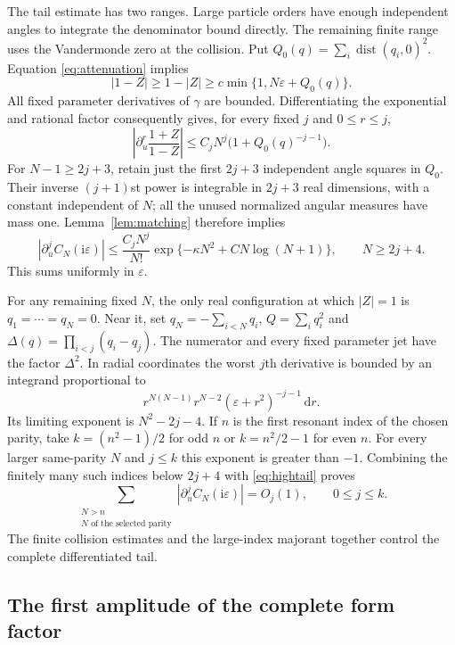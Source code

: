 \documentclass[11pt]{article}
\numberwithin{equation}{section}
\theoremstyle{definition}
\newcommand{\dd}{\,\mathrm d}
\newcommand{\ii}{\mathrm i}
\newcommand{\eps}{\varepsilon}
\newcommand{\dist}{\operatorname{dist}}
\begin{document}
The tail estimate has two ranges. Large particle orders have enough
independent angles to integrate the denominator bound directly. The
remaining finite range uses the Vandermonde zero at the collision.
Put $Q_0(q)=\sum_i\dist(q_i,0)^2$. Equation
\eqref{eq:attenuation} implies
\[
 |1-Z|\ge1-|Z|\ge c\min\{1,N\eps+Q_0(q)\}.
\]
All fixed parameter derivatives of $\gamma$ are bounded. Differentiating
the exponential and rational factor consequently gives, for every fixed
$j$ and $0\le r\le j$,
\begin{equation}\label{eq:globaljet}
 \left|\partial_u^r\frac{1+Z}{1-Z}\right|
 \le C_j N^j\bigl(1+Q_0(q)^{-j-1}\bigr).
\end{equation}
For $N-1\ge2j+3$, retain just the first $2j+3$ independent angle
squares in $Q_0$. Their inverse $(j+1)$st power is integrable in
$2j+3$ real dimensions, with a constant independent of $N$; all the
unused normalized angular measures have mass one. Lemma~\ref{lem:matching}
therefore implies
\begin{equation}\label{eq:hightail}
 |\partial_u^j C_N(\ii\eps)|
 \le \frac{C_jN^j}{N!}
       \exp\{-\kappa N^2+C N\log(N+1)\},\qquad N\ge2j+4.
\end{equation}
This sums uniformly in $\eps$.

For any remaining fixed $N$, the only real configuration at which
$|Z|=1$ is $q_1=\cdots=q_N=0$. Near it, set
$q_N=-\sum_{i<N}q_i$, $Q=\sum_iq_i^2$ and
$\Delta(q)=\prod_{i<j}(q_i-q_j)$. The numerator and every fixed
parameter jet have the factor $\Delta^2$. In radial coordinates the
worst $j$th derivative is bounded by an integrand proportional to
\[
 r^{N(N-1)}r^{N-2}(\eps+r^2)^{-j-1}\dd r.
\]
Its limiting exponent is $N^2-2j-4$. If $n$ is the first resonant
index of the chosen parity, take $k=(n^2-1)/2$ for odd $n$ or
$k=n^2/2-1$ for even $n$. For every larger same-parity $N$ and
$j\le k$ this exponent is greater than $-1$. Combining the finitely
many such indices below $2j+4$ with \eqref{eq:hightail} proves
\begin{equation}\label{eq:alltail}
 \sum_{\substack{N>n\\N\text{ of the selected parity}}}
 |\partial_u^j C_N(\ii\eps)|=O_j(1),\qquad0\le j\le k.
\end{equation}
The finite collision estimates and the large-index majorant together
control the complete differentiated tail.

\subsection{The first amplitude of the complete form factor}
\end{document}
